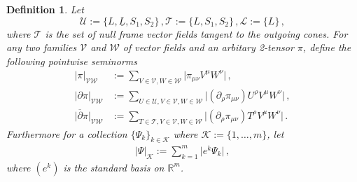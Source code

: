 \documentclass[11pt, a4paper]{amsart}
\numberwithin{equation}{section}
\newtheorem{definition}[theorem]{Definition}
\numberwithin{theorem}{section}
\newcommand{\R}{\mathbb{R}}
\newcommand{\p}{\partial}
\newcommand{\mn}{{\mu \nu}}
\newcommand{\lbar}{\underline{L}}
\newcommand{\pgood}{\overline{\partial}}
\newcommand{\K}{\mathcal{K}}
\begin{document}
\begin{definition} \label{def:U,T,L,seminorms}
Let
\begin{equation}
\mathcal{U} := \{ L, \lbar, S_1, S_2 \} \,, \mathcal{T} := \{ L, S_1, S_2 \} \,, \mathcal{L} := \{ L \} \,, \label{eq:def-U,T,L}
\end{equation}
where $\mathcal{T}$ is the set of null frame vector fields tangent to the outgoing cones.
For any two families $\mathcal{V}$ and $\mathcal{W}$ of vector fields and an arbitary 2-tensor $\pi$, define the following pointwise seminorms
\begin{align*}
\vert \pi \vert_{\mathcal{V} \mathcal{W}} & := \sum_{V \in \mathcal{V}, W \in \mathcal{W}} \vert \pi_\mn V^\mu W^\nu \vert \,, \\
\vert \p \pi \vert_{\mathcal{V} \mathcal{W}} & := \sum_{U \in \mathcal{U}, V \in \mathcal{V}, W \in \mathcal{W}} \vert ( \p_\rho \pi_{\mu \nu}) U^\rho V^\mu W^\nu \vert \,, \\
\vert \pgood \pi \vert_{\mathcal{V} \mathcal{W}} & := \sum_{T \in \mathcal{T}, V \in \mathcal{V}, W \in \mathcal{W}} \vert ( \p_\rho \pi_{\mu \nu}) T^\rho V^\mu W^\nu \vert \,.
\end{align*}
Furthermore for a collection $\{ \Psi_k \}_{k \in \K}$ where $\K := \{1 , \ldots, m \}$, let
\begin{align*}
\vert \Psi \vert_\K := \sum_{k=1}^m \vert e^k \Psi_k \vert \,,
\end{align*}
where $(e^k)$ is the standard basis on $\R^m$. 
\end{definition}
\end{document}
